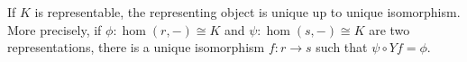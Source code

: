 If $K$ is representable, the representing object is unique up to unique isomorphism. More precisely, if $\phi: \hom(r, -) \cong K$ and $\psi: \hom(s, -) \cong K$ are two representations, there is a unique isomorphism $f: r \rightarrow s$ such that $\psi \circ Yf = \phi$.